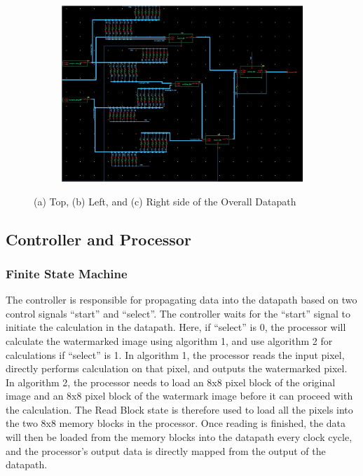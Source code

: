 \documentclass[letterpaper, 11pt]{article}
\begin{document}
\begin{figure}[ht!]
\begin{subfigure}[b]{.4\linewidth}
		\end{subfigure}
		\begin{subfigure}[b]{.4\linewidth}
			\includegraphics[width=\textwidth]{report_pics/datapath_btm_right.jpg}
			\caption{}
			\label{fig26c}
		\end{subfigure}
		\caption{(a) Top, (b) Left, and (c) Right side of the Overall Datapath}
	\end{figure}
	
	\newpage
	\subsection{Controller and Processor}
	\label{subsec:controller}
	
	\subsubsection{Finite State Machine}
	The controller is responsible for propagating data into the datapath based on two control signals “start” and “select”. The controller waits for the “start” signal to initiate the calculation in the datapath. Here, if “select” is 0, the processor will calculate the watermarked image using algorithm 1, and use algorithm 2 for calculations if “select” is 1. In algorithm 1, the processor reads the input pixel, directly performs calculation on that pixel, and outputs the watermarked pixel. In algorithm 2, the processor needs to load an 8x8 pixel block of the original image and an 8x8 pixel block of the watermark image before it can proceed with the calculation. The Read Block state is therefore used to load all the pixels into the two 8x8 memory blocks in the processor. Once reading is finished, the data will then be loaded from the memory blocks into the datapath every clock cycle, and the processor’s output data is directly mapped from the output of the datapath.
	
\end{document}
